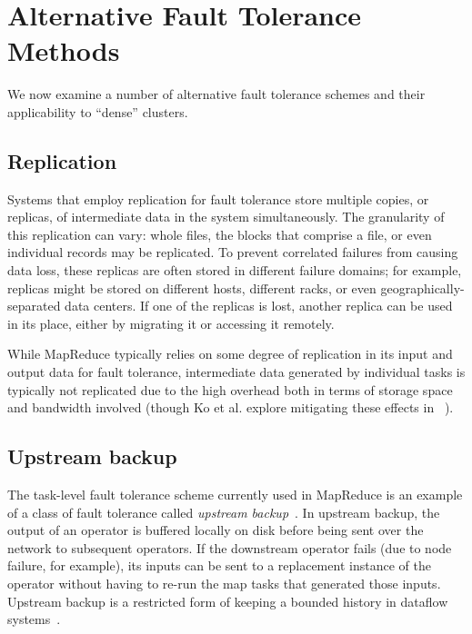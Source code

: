 \section{Alternative Fault Tolerance Methods}
\label{sec:fault_tolerance_approaches}

We now examine a number of alternative fault tolerance schemes and
their applicability to ``dense'' clusters.

\subsection{Replication}

Systems that employ replication for fault tolerance store multiple copies, or
replicas, of intermediate data in the system simultaneously. The granularity of
this replication can vary: whole files, the blocks that comprise a file, or
even individual records may be replicated. To prevent correlated failures from
causing data loss, these replicas are often stored in different failure
domains; for example, replicas might be stored on different hosts, different
racks, or even geographically-separated data centers. If one of the replicas is
lost, another replica can be used in its place, either by migrating it or
accessing it remotely.

While MapReduce typically relies on some degree of replication in its input and
output data for fault tolerance, intermediate data generated by individual \map
tasks is typically not replicated due to the high overhead both in terms of
storage space and bandwidth involved (though Ko et al. explore mitigating these
effects in ~\cite{ko-intermediate}).

\subsection{Upstream backup}

The task-level fault tolerance scheme currently used in MapReduce is an example
of a class of fault tolerance called \textit{upstream
  backup}~\cite{magda-ft,spark}.  In upstream backup, the output of an operator
is buffered locally on disk before being sent over the network to subsequent
operators.  If the downstream operator fails (due to node failure, for
example), its inputs can be sent to a replacement instance of the operator
without having to re-run the map tasks that generated those inputs.  Upstream
backup is a restricted form of keeping a bounded history in dataflow
systems~\cite{magda-ft}.

